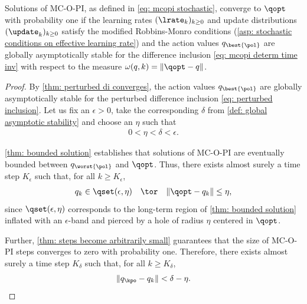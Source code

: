 \begin{proposition}
\label{thm: if det converges then stoch converges}
    Solutions of MC-O-PI, as defined in \eqref{eq: mcopi stochastic}, converge to $\qopt$ with probability one
    if the learning rates $(\lrate_k)_{k \geq 0}$ and update distributions $(\update_k)_{k \geq 0}$ satisfy the modified Robbins-Monro conditions (\autoref{asp: stochastic conditions on effective learning rate})
    and 
    the action values $q_{\best{\pol}}$ are globally asymptotically stable for 
    the difference inclusion \eqref{eq: mcopi determ time inv} with respect to the measure $\omega(q,k) = \|\qopt - q\|$.
\end{proposition}

\begin{proof}
By \autoref{thm: perturbed di converges}, the action values $q_{\best{\pol}}$ are globally asymptotically stable for the perturbed difference inclusion \eqref{eq: perturbed inclusion}.
Let us fix an $\epsilon>0$, take the corresponding $\delta$ from \autoref{def: global asymptotic stability} and choose an $\eta$ such that
\begin{align*}
    0 < \eta < \delta < \epsilon .
\end{align*}

\autoref{thm: bounded solution} establishes that solutions of MC-O-PI are eventually bounded between $q_{\worst{\pol}}$ and $\qopt$.
Thus, there exists almost surely a time step $K_\epsilon$ such that, for all $k \geq K_\epsilon$,
\begin{align}
\label{eq: K epsilon}
    q_k \in \qset(\epsilon, \eta)
    \quad \tor \quad 
    \|\qopt - q_k\| \leq \eta ,
\end{align}
since $\qset(\epsilon, \eta)$ corresponds to the long-term region of \autoref{thm: bounded solution} inflated with an $\epsilon$-band and pierced by a hole of radius $\eta$ centered in $\qopt$.

Further, \autoref{thm: steps become arbitrarily small} guarantees that the size of MC-O-PI steps converges to zero with probability one.
Therefore, there exists almost surely a time step $K_\delta$ such that, for all $k \geq K_\delta$,
\begin{align}
\label{eq: K delta}
    \| q_\kpo - q_k \| < \delta - \eta.
\end{align}


\end{proof}

